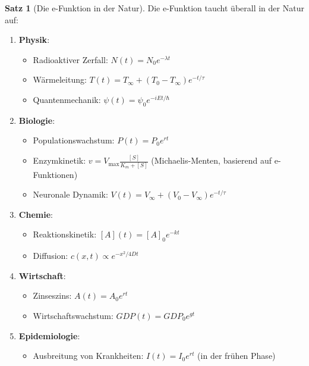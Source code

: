 ﻿\documentclass[a4paper,12pt]{report}
\theoremstyle{definition}
\newtheorem{satz}{Satz}
\begin{document}
	\begin{satz}[Die e-Funktion in der Natur]
		Die e-Funktion taucht überall in der Natur auf:
		
		\begin{enumerate}
			\item[-] \textbf{Physik}:
			\begin{itemize}
				\item[-] Radioaktiver Zerfall: $N(t) = N_0 e^{-\lambda t}$
				\item[-] Wärmeleitung: $T(t) = T_{\infty} + (T_0 - T_{\infty}) e^{-t/\tau}$
				\item[-] Quantenmechanik: $\psi(t) = \psi_0 e^{-iEt/\hbar}$
			\end{itemize}
			
			\item[-] \textbf{Biologie}:
			\begin{itemize}
				\item[-] Populationswachstum: $P(t) = P_0 e^{rt}$
				\item[-] Enzymkinetik: $v = V_{\max} \frac{[S]}{K_m + [S]}$ (Michaelis-Menten, basierend auf e-Funktionen)
				\item[-] Neuronale Dynamik: $V(t) = V_{\infty} + (V_0 - V_{\infty}) e^{-t/\tau}$
			\end{itemize}
			
			\item[-] \textbf{Chemie}:
			\begin{itemize}
				\item[-] Reaktionskinetik: $[A](t) = [A]_0 e^{-kt}$
				\item[-] Diffusion: $c(x,t) \propto e^{-x^2/4Dt}$
			\end{itemize}
			
			\item[-] \textbf{Wirtschaft}:
			\begin{itemize}
				\item[-] Zinseszins: $A(t) = A_0 e^{rt}$
				\item[-] Wirtschaftswachstum: $GDP(t) = GDP_0 e^{gt}$
			\end{itemize}
			
			\item[-] \textbf{Epidemiologie}:
			\begin{itemize}
				\item[-] Ausbreitung von Krankheiten: $I(t) = I_0 e^{rt}$ (in der frühen Phase)
			\end{itemize}
		\end{enumerate}
	\end{satz}
	
\end{document}
